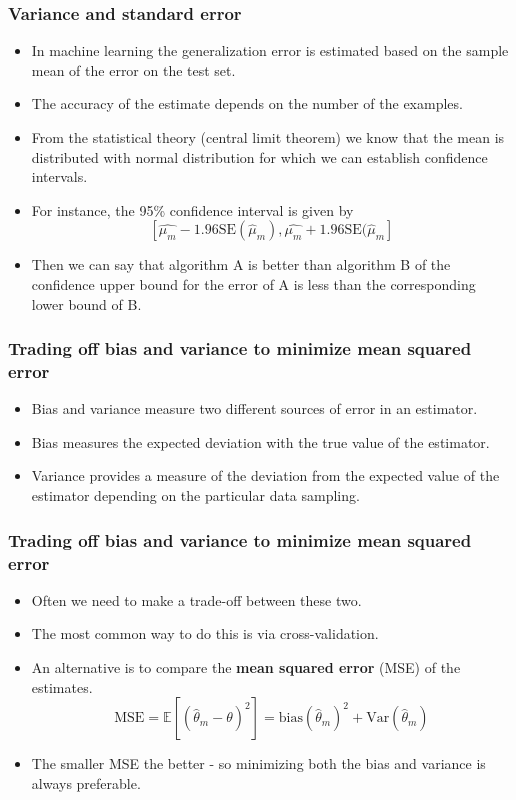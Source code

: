 \documentclass[notes]{beamer}          %
\newcommand{\field}[1]{\mathbb{#1}}
\begin{document}
\begin{frame}
\frametitle{Variance and standard error}
    \begin{itemize}
        \item In machine learning the generalization error is estimated based on the sample mean of the error on the test set.
        \item The accuracy of the estimate depends on the number of the examples.
        \item From the statistical theory (central limit theorem) we know that the mean is distributed with normal distribution for which we can establish confidence intervals.
        \item For instance, the 95\% confidence interval is given by
        $$
        \left [ \hat{\mu_m} - 1.96 \mbox{SE}(\hat{\mu}_m), \hat{\mu_m} + 1.96 \mbox{SE}(\hat{\mu}_m \right ]
        $$
        \item Then we can say that algorithm A is better than algorithm B of the confidence upper bound for the error of A is less than the corresponding lower bound of B.
    \end{itemize}
\end{frame}


\begin{frame}
\frametitle{Trading off bias and variance to minimize  mean squared error}
    \begin{itemize}
        \item Bias and variance measure two different sources of error in an estimator.
        \item Bias measures the expected deviation with the true value of the estimator.
        \item Variance provides a measure of the deviation from the expected value of the estimator depending on the particular data sampling.
    \end{itemize}
\end{frame}


\begin{frame}
\frametitle{Trading off bias and variance to minimize  mean squared error}
    \begin{itemize}
        \item Often we need to make a trade-off between these two.
        \item The most common way to do this is via cross-validation.
        \item An alternative is to compare the {\bf mean squared error} (MSE) of the estimates.
        $$
        \mbox{MSE} = \field{E}[(\hat{\theta}_m -  \theta)^2] = \mbox{bias}(\hat{\theta}_m)^2 + \mbox{Var}(\hat{\theta}_m)
        $$
        \item The smaller MSE the better - so minimizing both the bias and variance is always preferable.

    \end{itemize}
\end{frame}
\end{document}
